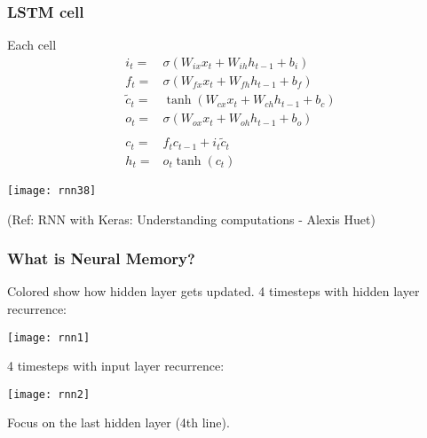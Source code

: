 \begin{frame}[fragile] \frametitle{LSTM cell}
Each cell
\begin{align}
i_t =& \sigma(W_{ix} x_t + W_{ih} h_{t-1} + b_i) \\
f_t =& \sigma(W_{fx} x_t + W_{fh} h_{t-1} + b_f) \\
\tilde{c}_t =& \tanh(W_{cx} x_t + W_{ch} h_{t-1} + b_c) \\
o_t =& \sigma(W_{ox} x_t + W_{oh} h_{t-1} + b_o) \\
 \\
c_t =& f_t c_{t-1} + i_t \tilde{c}_t \\
h_t =& o_t \tanh(c_t)
\end{align} %


\begin{center}
\texttt{[image: rnn38]}

{\tiny (Ref: RNN with Keras: Understanding computations - Alexis Huet)}
\end{center}
\end{frame}


\begin{frame}[fragile] \frametitle{What is Neural Memory?}
Colored show how hidden layer gets updated. 
4 timesteps with hidden layer recurrence:
\begin{center}
\texttt{[image: rnn1]}
\end{center}
4 timesteps with input  layer recurrence:
\begin{center}
\texttt{[image: rnn2]}
\end{center}
Focus on the last hidden layer (4th line).
\end{frame}


